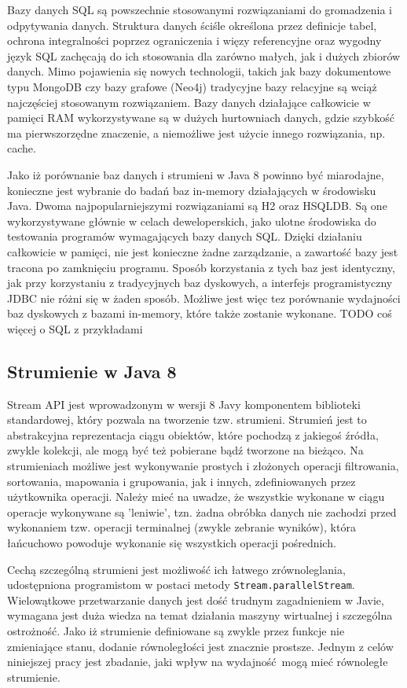 \documentclass[12pt]{extarticle}
\begin{document}
    Bazy danych SQL są powszechnie stosowanymi rozwiązaniami do gromadzenia i odpytywania danych. Struktura danych ściśle określona przez definicje tabel, ochrona integralności poprzez ograniczenia i więzy referencyjne oraz wygodny język SQL zachęcają do ich stosowania dla zarówno małych, jak i dużych zbiorów danych. Mimo pojawienia się nowych technologii, takich jak bazy dokumentowe typu MongoDB czy bazy grafowe (Neo4j) tradycyjne bazy relacyjne są wciąż najczęściej stosowanym rozwiązaniem. Bazy danych działające całkowicie w pamięci RAM wykorzystywane są w dużych hurtowniach danych, gdzie szybkość ma pierwszorzędne znaczenie, a niemożliwe jest użycie innego rozwiązania, np. cache. 

    Jako iż porównanie baz danych i strumieni w Java 8 powinno być miarodajne, konieczne jest wybranie do badań baz in-memory działających w środowisku Java. Dwoma najpopularniejszymi rozwiązaniami są H2 oraz HSQLDB. Są one wykorzystywane głównie w celach deweloperskich, jako ulotne środowiska do testowania programów wymagających bazy danych SQL. Dzięki działaniu całkowicie w pamięci, nie jest konieczne żadne zarządzanie, a zawartość bazy jest tracona po zamknięciu programu. Sposób korzystania z tych baz jest identyczny, jak przy korzystaniu z tradycyjnych baz dyskowych, a interfejs programistyczny JDBC nie różni się w żaden sposób. Możliwe jest więc tez porównanie wydajności baz dyskowych z bazami in-memory, które także zostanie wykonane.
    TODO coś więcej o SQL z przykładami


\subsection{Strumienie w Java 8}

    Stream API jest wprowadzonym w wersji 8 Javy komponentem biblioteki standardowej, który pozwala na tworzenie tzw. strumieni. Strumień jest to abstrakcyjna reprezentacja ciągu obiektów, które pochodzą z jakiegoś źródła, zwykle kolekcji, ale mogą być też pobierane bądź tworzone na bieżąco. Na strumieniach możliwe jest wykonywanie prostych i złożonych operacji filtrowania, sortowania, mapowania i grupowania, jak i innych, zdefiniowanych przez użytkownika operacji. Należy mieć na uwadze, że wszystkie wykonane w ciągu operacje wykonywane są 'leniwie', tzn. żadna obróbka danych nie zachodzi przed wykonaniem tzw. operacji terminalnej (zwykle zebranie wyników), która łańcuchowo powoduje wykonanie się wszystkich operacji pośrednich.

    Cechą szczególną strumieni jest możliwość ich łatwego zrównoleglania, udostępniona programistom w postaci metody \texttt{Stream.parallelStream}. Wielowątkowe przetwarzanie danych jest dość trudnym zagadnieniem w Javie, wymagana jest duża wiedza na temat działania maszyny wirtualnej i szczególna ostrożność. Jako iż strumienie definiowane są zwykle przez funkcje nie zmieniające stanu, dodanie równoległości jest znacznie prostsze. Jednym z celów niniejszej pracy jest zbadanie, jaki wpływ na wydajność mogą mieć równoległe strumienie.
\end{document}

